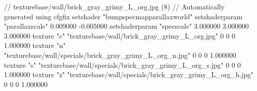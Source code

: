 // texturebase/wall/brick_gray_grimy_L_org.jpg (8)
// Automatically generated using cfgfix
setshader "bumpspecmapparallaxworld"
setshaderparam "parallaxscale" 0.009000 -0.005000
setshaderparam "specscale" 3.000000 3.000000 3.000000
texture "c" "texturebase/wall/brick_gray_grimy_L_org.jpg" 0 0 0 1.000000
texture "n" "texturebase/wall/specials/brick_gray_grimy_L_org_n.jpg" 0 0 0 1.000000
texture "s" "texturebase/wall/specials/brick_gray_grimy_L_org_s.jpg" 0 0 0 1.000000
texture "z" "texturebase/wall/specials/brick_gray_grimy_L_org_h.jpg" 0 0 0 1.000000
